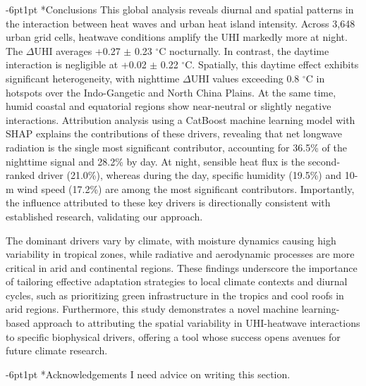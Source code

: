 \documentclass[]{nature}
\makeatletter
\renewcommand{\section}{\@startsection {section}{1}{0pt}%
    {-6pt}{1pt}%
    {\large\sffamily\bfseries}%
    }
\makeatother
\begin{document}
\section*{Conclusions}
This global analysis reveals diurnal and spatial patterns in the interaction between heat waves and urban heat island intensity. Across 3,648 urban grid cells, heatwave conditions amplify the UHI markedly more at night. The \ensuremath{\Delta }UHI averages +0.27 \ensuremath{\pm} 0.23 \ensuremath{^\circ}C nocturnally. In contrast, the daytime interaction is negligible at +0.02 \ensuremath{\pm} 0.22 \ensuremath{^\circ}C. Spatially, this daytime effect exhibits significant heterogeneity, with nighttime \ensuremath{\Delta }UHI values exceeding 0.8 \ensuremath{^\circ}C in hotspots over the Indo-Gangetic and North China Plains. At the same time, humid coastal and equatorial regions show near-neutral or slightly negative interactions. Attribution analysis using a CatBoost machine learning model with SHAP explains the contributions of these drivers, revealing that net longwave radiation is the single most significant contributor, accounting for 36.5\% of the nighttime signal and 28.2\% by day. At night, sensible heat flux is the second-ranked driver (21.0\%), whereas during the day, specific humidity (19.5\%) and 10-m wind speed (17.2\%) are among the most significant contributors. Importantly, the influence attributed to these key drivers is directionally consistent with established research, validating our approach.

The dominant drivers vary by climate, with moisture dynamics causing high variability in tropical zones, while radiative and aerodynamic processes are more critical in arid and continental regions. These findings underscore the importance of tailoring effective adaptation strategies to local climate contexts and diurnal cycles, such as prioritizing green infrastructure in the tropics and cool roofs in arid regions. Furthermore, this study demonstrates a novel machine learning-based approach to attributing the spatial variability in UHI-heatwave interactions to specific biophysical drivers, offering a tool whose success opens avenues for future climate research. 
    
\section*{Acknowledgements }
I need advice on writing this section.
    




\end{document}

